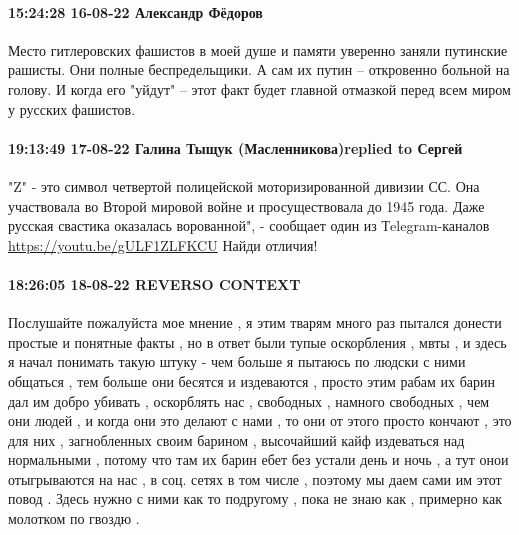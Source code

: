  
 
 
 
 

\paragraph{15:24:28 16-08-22 Александр Фёдоров}

\obeycr
Место гитлеровских фашистов в моей душе и памяти уверенно заняли путинские рашисты. 
Они полные беспредельщики. А сам их путин -- откровенно больной на голову. 
И когда его "уйдут" -- этот факт будет главной отмазкой перед всем миром у русских фашистов.
\restorecr

\paragraph{19:13:49 17-08-22 Галина Тыщук (Масленникова)replied to Сергей}

"Z" - это символ четвертой полицейской моторизированной дивизии СС. Она
участвовала во Второй мировой войне и просуществовала до 1945 года. Даже
русская свастика оказалась ворованной", - сообщает один из Тelegram-каналов
\url{https://youtu.be/gULF1ZLFKCU} Найди отличия!

\paragraph{18:26:05 18-08-22 REVERSO CONTEXT}

Послушайте пожалуйста мое мнение , я этим тварям много раз пытался донести
простые и понятные факты , но в ответ были тупые оскорбления , мвты , и здесь я
начал понимать такую штуку - чем больше я пытаюсь по людски с ними общаться ,
тем больше они бесятся и издеваются , просто этим рабам их барин дал им добро
убивать , оскорблять нас , свободных , намного свободных , чем они людей , и
когда они это делают с нами , то они от этого просто кончают , это для них ,
загнобленных своим барином , высочайший кайф издеваться над нормальными ,
потому что там их барин ебет без устали день и ночь , а тут онои отыгрываются
на нас , в соц. сетях в том числе , поэтому мы даем сами им этот повод . Здесь
нужно с ними как то подругому , пока не знаю как , примерно как молотком по
гвоздю .


